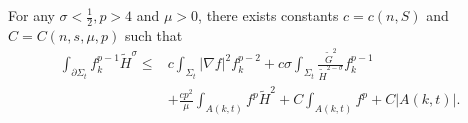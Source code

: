 \begin{lemma} \label{BoundaryFH}
    For any $\sigma <\frac{1}{2}, p>4$ and $\mu >0$, there exists constants $c=c(n,S)$ and $C=C(n,s,\mu ,p)$ such that
    \begin{equation}
    \begin{split}
        \int_{\partial \Sigma_t} f_{k}^{p-1}\tilde{H}^{\sigma } 
    \leq & c \int_{\Sigma_t} \left| \nabla f \right| ^2 f_{k}^{p-2} +c \sigma \int_{\Sigma_t} \frac{\tilde{G}^{2} }{\tilde{H}^{2-\sigma }  }f_{k}^{p-1} \\
    &+ \frac{cp^2}{\mu }\int_{A(k,t)}^{}f^p \tilde{H}^{2} + C \int_{A(k,t)}^{}f^p + C \left| A(k,t) \right| .
    \end{split}
    \end{equation} 
\end{lemma}


